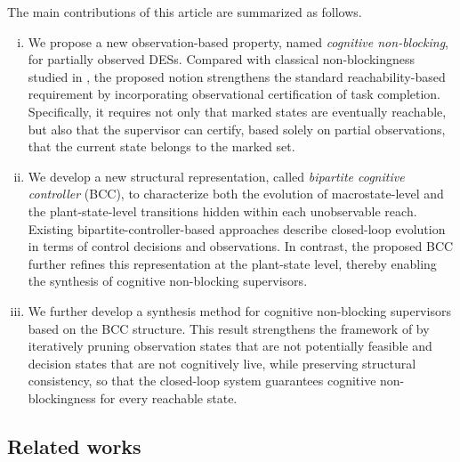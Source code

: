 \documentclass[final,5p,times,twocolumn,authoryear]{elsarticle}
\begin{document}
The main contributions of this article are summarized as follows.
%
\begin{enumerate}[(i)]
    \item We propose a new observation-based property, named \emph{cognitive non-blocking}, for partially observed DESs.
    Compared with classical non-blockingness studied in  \cite{yin2016synthesis, yin2018synthesis}, the proposed notion strengthens the standard reachability-based requirement by incorporating observational certification of task completion.
    Specifically, it requires not only that marked states are eventually reachable, but also that the supervisor can certify, based solely on partial observations, that the current state belongs to the marked set.

    \item We develop a new structural representation, called \emph{bipartite cognitive controller} (BCC), to characterize both the evolution of macrostate-level and the plant-state-level transitions hidden within each unobservable reach. 
    Existing bipartite-controller-based approaches \cite{yin2016uniform,zheng2026enforcement} describe closed-loop evolution in terms of control decisions and observations. In contrast, the proposed BCC further refines this representation at the plant-state level, thereby enabling the synthesis of cognitive non-blocking supervisors.

    \item We further develop a synthesis method for cognitive non-blocking supervisors based on the BCC structure. 
    This result strengthens the framework of \cite{yin2016synthesis} by iteratively pruning observation states that are not potentially feasible and decision states that are not cognitively live, while preserving structural consistency, so that the closed-loop system guarantees cognitive non-blockingness for every reachable state.
    
\end{enumerate}

\subsection{Related works}
\end{document}
